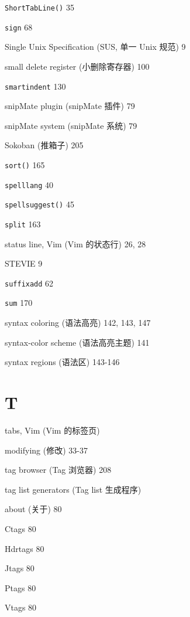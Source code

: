 \begin{multicols}{2}
\hangindent=3pc  \texttt{ShortTabLine()} 35

\hangindent=3pc  \texttt{sign} 68

\hangindent=3pc  Single Unix Specification (SUS, 单一 Unix 规范) 9

\hangindent=3pc  small delete register (小删除寄存器) 100

\hangindent=3pc  \texttt{smartindent} 130

\hangindent=3pc  snipMate plugin (snipMate 插件) 79

\hangindent=3pc  snipMate system (snipMate 系统) 79

\hangindent=3pc  Sokoban (推箱子) 205

\hangindent=3pc  \texttt{sort()} 165

\hangindent=3pc  \texttt{spelllang} 40

\hangindent=3pc  \texttt{spellsuggest()} 45

\hangindent=3pc  \texttt{split} 163

\hangindent=3pc  status line, Vim (Vim 的状态行) 26, 28

\hangindent=3pc  STEVIE 9

\hangindent=3pc  \texttt{suffixadd} 62

\hangindent=3pc  \texttt{sum} 170

\hangindent=3pc  syntax coloring (语法高亮) 142, 143, 147

\hangindent=3pc  syntax-color scheme (语法高亮主题) 141

\hangindent=3pc  syntax regions (语法区) 143-146

\hangindent=3pc  \section*{T}

\hangindent=3pc  tabs, Vim (Vim 的标签页) \par
\hangindent=3pc \quad modifying (修改) 33-37 \par

\hangindent=3pc  tag browser (Tag 浏览器) 208

\hangindent=3pc  tag list generators (Tag list 生成程序) \par
\hangindent=3pc \quad about (关于) 80 \par
\hangindent=3pc \quad Ctags 80 \par
\hangindent=3pc \quad Hdrtags 80 \par
\hangindent=3pc \quad Jtags 80 \par
\hangindent=3pc \quad Ptags 80 \par
\hangindent=3pc \quad Vtags 80 \par


\end{multicols}
